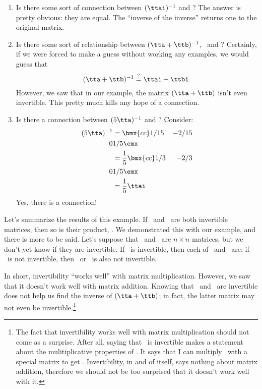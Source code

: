{\begin{enumerate}
\item		Is there some sort of connection between $(\ttai)^{-1}$ and \tta? The answer is pretty obvious: they are equal. The ``inverse of the inverse'' returns one to the original matrix.


\item		Is there some sort of relationship between $(\tta+\ttb)^{-1}$, \ttai\ and \ttbi? Certainly, if we were forced to make a guess without working any examples, we would guess that 
\[
(\tta+\ttb)^{-1} \overset{\text{?}}{=} \ttai+\ttbi.
\]
However, we saw that in our example, the matrix $(\tta+\ttb)$ isn't even invertible. This pretty much kills any hope of a connection.

\item		Is there a connection between $(5\tta)^{-1}$ and \ttai? Consider:
	\begin{align*} 
   (5\tta)^{-1} &= \bmx{cc} 1/15 & -2/15\\ 0 & 1/5\emx \\
				&= \frac{1}{5} \bmx{cc} 1/3 & -2/3\\0&1/5\emx \\
				&= \frac 15 \ttai
	\end{align*}
\enlargethispage{2\baselineskip}	
	Yes, there is a connection!
\end{enumerate}
} 

\medskip

Let's summarize the results of this example. If \tta\ and \ttb\ are both invertible matrices, then so is their product, \tta\ttb. We demonstrated this with our example, and there is more to be said. Let's suppose that \tta\ and \ttb\ are $n\times n$ matrices, but we don't yet know if they are invertible. If \tta\ttb\ is invertible, then each of \tta\ and \ttb\ are; if \tta\ttb\ is not invertible, then \tta\ or \ttb\ is also not invertible.

In short, invertibility ``works well'' with matrix multiplication. However, we saw that it doesn't work well with matrix addition. Knowing that \tta\ and \ttb\ are invertible does not help us find the inverse of $(\tta+\ttb)$; in fact, the latter matrix may not even be invertible.\footnote{The fact that invertibility works well with matrix multiplication should not come as a surprise. After all, saying that \tta\ is invertible makes a statement about the mulitiplicative properties of \tta. It says that I can multiply \tta\ with a special matrix to get \tti. Invertibility, in and of itself, says nothing about matrix addition, therefore we should not be too surprised that it doesn't work well with it.}

